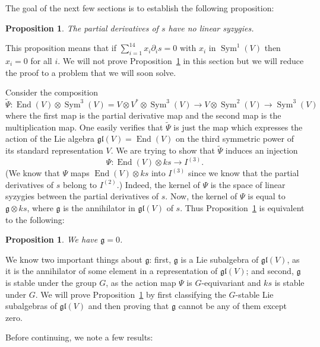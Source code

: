 \documentclass{amsart}
\newtheorem{proposition}[theorem]{Proposition}
\theoremstyle{definition}
\theoremstyle{remark}
\DeclareMathOperator{\Sym}{Sym}
\DeclareMathOperator{\End}{End}
\def\wt{\mathbf{wt}}
\let\mf\mathfrak
\let\wt\widetilde
\begin{document}
The goal of the next few sections is to establish the following proposition:

\begin{proposition}
\label{prop:nosyz}
The partial derivatives of $s$ have no linear syzygies.
\end{proposition}

This proposition means that if $\sum_{i=1}^{14} x_i \partial_i s=0$ with
$x_i$ in $\Sym^1(V)$ then $x_i=0$ for all $i$.  We will not prove
Proposition~\ref{prop:nosyz} in this section but we will reduce the proof to a
problem that we will soon solve.

Consider the composition
\begin{displaymath}
\wt{\Psi}:\End(V) \otimes \Sym^3(V) = V \otimes V^* \otimes \Sym^3(V) \to
V \otimes \Sym^2(V) \to \Sym^3(V)
\end{displaymath}
where the first map is the partial derivative map and the second map is
the multiplication map.  One easily verifies that $\wt{\Psi}$ is just the map
which expresses the action of the Lie algebra $\mf{gl}(V)=\End(V)$ on the
third symmetric power of its standard representation $V$.  We
are trying to show that $\wt{\Psi}$ induces an injection
\begin{displaymath}
\Psi:\End(V) \otimes ks \to I^{(3)}.
\end{displaymath}
(We know that $\Psi$ maps $\End(V) \otimes ks$ into $I^{(3)}$
since we know that the partial derivatives of $s$ belong to $I^{(2)}$.)
Indeed, the kernel of $\Psi$ is the space of linear syzygies between the
partial derivatives of $s$.  Now, the kernel of $\Psi$ is equal to $\mf{g}
\otimes ks$, where $\mf{g}$ is the annihilator in $\mf{gl}(V)$ of $s$.  Thus
Proposition~\ref{prop:nosyz} is equivalent to the following:

\begin{proposition}
\label{prop:l-zero}
We have $\mf{g}=0$.
\end{proposition}

We know two important things about $\mf{g}$:  first, $\mf{g}$ is a Lie
subalgebra of $\mf{gl}(V)$, as it is the annihilator of some element in a
representation of $\mf{gl}(V)$; and second, $\mf{g}$ is stable under the
group $G$, as the action map $\Psi$ is $G$-equivariant and $ks$ is stable
under $G$.  We will prove Proposition~\ref{prop:l-zero} by first classifying
the $G$-stable Lie subalgebras of $\mf{gl}(V)$ and then proving that $\mf{g}$
cannot be any of them except zero.

Before continuing, we note a few results:
\end{document}

